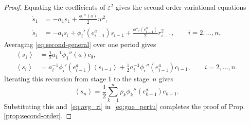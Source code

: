 \documentclass[onecolumn]{IEEEtran}
\newcommand{\avg}[1]{\left\langle #1\right\rangle}
\begin{document}
\begin{proof}
Equating the coefficients of $\varepsilon^2$ gives the second-order
variational equations
\begin{align}
    \dot s_1
    &=
    -a_1s_1+\frac{\phi_1''(a)}{2} w ^2 ,
   \nonumber \\
    \dot s_i
    &=
    -a_is_i+ \phi_i'(e_{i-1}^a) s_{i-1}
    +\frac{\phi''_i(e_{i-1}^a)}{2}r_{i-1}^2,
    \qquad i=2,\ldots,n.
    \label{eq:second-general}
\end{align}
Averaging \eqref{eq:second-general}   over one period gives
\begin{align*}
    \avg{s_1}
  &  =
\frac1{2}   a_1^{-1}  \phi_1''( a)  c_0   , \\
    \avg{s_i} &  =
  a_i^{-1}   \phi_i'(e_{i-1}^a) \avg{s_{i-1}}
    +
\frac1{2}  a_i^{-1}  \phi_i''(e_{i-1}^a) c_{i-1} ,
    \qquad i=2,\ldots,n.
    \end{align*}
Iterating  this recursion from stage $1$ to the stage~$n$  gives 
\begin{equation*}
    \avg{s_n}
    =
    \frac{1}{2}
    \sum_{k=1}^n\rho_k   \phi_k''(e_{k-1}^a) c_{k-1}.
    \label{eq:snmean}
\end{equation*}
Substituting this and~\eqref{eq:avg_ri} in~\eqref{eq:goe_pertu} completes the proof of  Prop. \ref{prop:second-order}. 
\end{proof}

 
 

\end{document}
